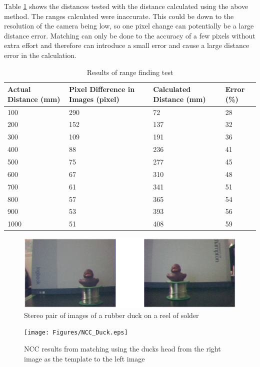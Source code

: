 Table \ref{table:range} shows the distances tested with the distance calculated using the above method. The ranges calculated were inaccurate. This could be down to the resolution of the camera being low, so one pixel change can potentially be a large distance error. Matching can only be done to the accuracy of a few pixels without extra effort and therefore can introduce a small error and cause a large distance error in the calculation. 

\begin{table}
\centering
\caption{Results of range finding test}
\label{table:range}
\begin{tabular}{|p{3cm}|p{3cm}|p{3cm}|p{3cm}|} \hline
Actual Distance (mm) & Pixel Difference in Images (pixel) & Calculated Distance (mm) & Error (\%) \\ \hline
100 & 290 & 72 & 28\\ 
200 & 152 & 137 & 32\\ 
300 & 109 & 191 & 36\\ 
400 & 88 & 236 & 41\\ 
500 & 75 & 277 & 45\\ 
600 & 67 & 310 & 48\\ 
700 & 61 & 341 & 51\\ 
800 & 57 & 365 & 54\\ 
900 & 53 & 393 & 56\\ 
1000 & 51 & 408 & 59\\ \hline
\end{tabular}
\end{table}

\begin{figure}
\includegraphics[width=\textwidth ]{Figures/Duck_L_R.eps}
\caption{Stereo pair of images of a rubber duck on a reel of solder}
\label{fig:duck:stereo}
\end{figure}

\begin{figure}
\texttt{[image: Figures/NCC\_Duck.eps]}
\caption{NCC results from matching using the ducks head from the right image as the template to the left image}
\label{fig:duck:ncc}
\end{figure}

